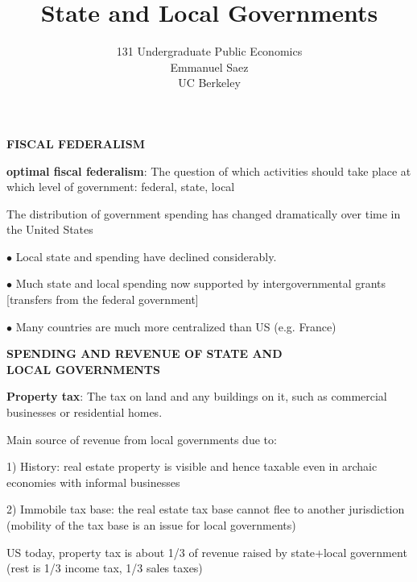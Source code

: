 \documentclass[landscape]{slides}
\author{131 Undergraduate Public Economics \\ Emmanuel Saez \\ UC Berkeley}
\date{}
\title{State and Local Governments} \onlyslides{1-300}
\begin{document}
\begin{slide}
\maketitle
\end{slide}

%
%
%
%
%

\begin{slide}
\begin{center}
{\bf FISCAL FEDERALISM}
\end{center}

{\bf optimal fiscal federalism}:
The question of which activities should take place at which level of government: federal, state, local

The distribution of government spending has changed dramatically over time in the United States

$\bullet$ Local state and spending have declined considerably.

$\bullet$ Much state and local spending now supported by
intergovernmental grants [transfers from the federal government]

$\bullet$ Many countries are much more centralized than US (e.g. France)

\end{slide}


\begin{slide}

\end{slide}

\begin{slide}
\begin{center}
{\bf SPENDING AND REVENUE OF STATE AND \\ LOCAL GOVERNMENTS}
\end{center}

{\bf Property tax}:
The tax on land and any buildings on it, such as commercial businesses or residential homes.

Main source of revenue from local governments due to:

1) History: real estate property is visible and hence taxable even in archaic economies
with informal businesses

2) Immobile tax base: the real estate tax base cannot flee to another jurisdiction (mobility
of the tax base is an issue for local governments)

US today, property tax is about 1/3 of revenue raised by state+local government (rest is 1/3 income tax,
1/3 sales taxes)

\end{slide}
\end{document}
